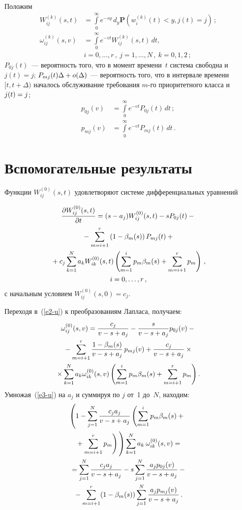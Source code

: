 \begin{multicols}{2}
Положим
\begin{align*}
W_{ij}^{(k)}(s,t)&=\int\limits_0^{\infty}e^{-sy}\,d_y\mathbf{P}(w_i^{(k)}(t)<y,j(t)=j)\,;
\\
\omega_{ij}^{(k)}(s,v)&=\int\limits_0^{\infty}e^{-vt}
W_{ij}^{(k)}(s,t)\,dt,\\\
&i=0,\ldots,r\,,\ j=1,\ldots,N\,,\ k=0,1,2\,;
\end{align*}
$P_{0j}(t)$~--- вероятность того, что в момент времени~$t$ система 
свободна и $j(t)=j$; $P_{mj}(t) \Delta\hm+o(\Delta)$~--- вероятность того, что в
интервале времени $[t,t+\Delta)$ началось обслуживание требования $m$-го приоритетного 
класса и $j(t)\hm=j$;
\begin{align*}
p_{0j}(v)&=\int\limits_0^{\infty}e^{-vt}P_{0j}(t)\,dt\,;\\
p_{mj}(v)&=\int\limits_0^{\infty}e^{-vt}P_{mj}(t)\,dt\,.
\end{align*}


\section{Вспомогательные результаты}

Функции $W_{ij}^{(0)}(s,t)$ удовлетворяют системе дифференциальных уравнений

\noindent
\begin{multline}
\label{e2-u}
\displaystyle\frac{\displaystyle \partial W_{ij}^{(0)}(s,t)\mathstrut}{\displaystyle \partial t\mathstrut}=(s-a_j) W_{ij}^{(0)}(s,t)-s P_{0j}(t)-{}\\
{}-
\sum\limits_{m=i+1}^r\left(1-\beta_m(s)\right) P_{mj}(t)+{}\\
{}+c_j \sum\limits_{k=1}^N a_k  W_{ik}^{(0)}(s,t) 
\left(\sum\limits_{m=1}^ip_m\beta_m(s)+\sum\limits_{m=i+1}^rp_m\right)\,,\\
i=0,\ldots,r\,,
\end{multline}
с начальным условием $W_{ij}^{(0)}(s,0)=c_j$.

Переходя в~(\ref{e2-u}) к преобразованиям Лапласа, получаем:
\begin{multline}
\label{e3-u}
\omega_{ij}^{(0)}(s,v)=\displaystyle\frac{\displaystyle c_j\mathstrut}{\displaystyle v-s+a_j\mathstrut}-\displaystyle\frac{\displaystyle s\mathstrut}{\displaystyle v-s+a_j\mathstrut} p_{0j}(v)-{}\\
{}-\sum\limits_{m=i+1}^r
\displaystyle\frac{\displaystyle 1-\beta_m(s)\mathstrut}{\displaystyle v-s+a_j\mathstrut}\, p_{mj}(v)+\displaystyle\frac{\displaystyle c_j\mathstrut}{\displaystyle v-s+a_j\mathstrut}\times{}\\
\!\!{}\times
\sum\limits_{k=1}^N a_k \omega_{ik}^{(0)}(s,v)
\left(\sum\limits_{m=1}^ip_m\beta_m(s)+\sum\limits_{m=i+1}^rp_m\right).\!
\end{multline}
Умножая~(\ref{e3-u}) на $a_j$ и суммируя по $j$ от~1 до~$N$, находим:
\begin{multline}
\label{e4-u}
\left(1-\sum\limits_{j=1}^N\fr{c_ja_j}{v-s+a_j}\left(\sum\limits_{m=1}^ip_m\beta_m(s)+{}\right.\right.\\
\left.\left.{}+
\sum\limits_{m=i+1}^rp_m\right)\vphantom{\sum\limits_{j=1}^N}\right)
\sum\limits_{k=1}^N a_k\: \omega_{ik}^{(0)}(s,v)={}\\
{}= \sum\limits_{j=1}^N\fr{c_ja_j}{v-s+a_j}-s\sum\limits_{j=1}^N\fr{a_jp_{0j}(v)}{v-s+a_j}-{}\\
{}-
\sum\limits_{m=i+1}^r (1-\beta_m(s))\sum\limits_{j=1}^N\fr{a_jp_{mj}(v)}{v-s+a_j}\,.
\end{multline}


\end{multicols}
